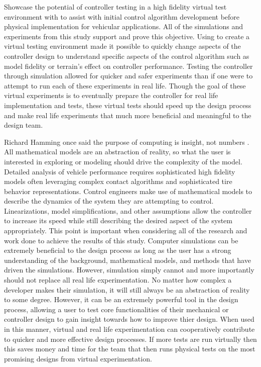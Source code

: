 \documentclass[12pt,onecolumn]{report}
\newcommand{\CHRONO}{{\sffamily{{Chrono}}}}
\begin{document}
\begin{enumerate}
Showcase the potential of controller testing in a high fidelity virtual test environment with {\CHRONO} to assist with initial control algorithm development before physical implementation for vehicular applications. All of the simulations and experiments from this study support and prove this objective. Using {\CHRONO} to create a virtual testing environment made it possible to quickly change aspects of the controller design to understand specific aspects of the control algorithm such as model fidelity or terrain's effect on controller performance. Testing the controller through simulation allowed for quicker and safer experiments than if one were to attempt to run each of these experiments in real life. Though the goal of these virtual experiments is to eventually prepare the controller for real life implementation and tests, these virtual tests should speed up the design process and make real life experiments that much more beneficial and meaningful to the design team. 
\end{enumerate}

Richard Hamming once said the purpose of computing is insight, not numbers \cite{NumMethods}. All mathematical models are an abstraction of reality, so what the user is interested in exploring or modeling should drive the complexity of the model. Detailed analysis of vehicle performance requires sophisticated high fidelity models often leveraging complex contact algorithms and sophisticated tire behavior representations. Control engineers make use of mathematical models to describe the dynamics of the system they are attempting to control. Linearizations, model simplifications, and other assumptions allow the controller to increase its speed while still describing the desired aspect of the system appropriately. This point is important when considering all of the research and work done to achieve the results of this study. Computer simulations can be extremely beneficial to the design process as long as the user has a strong understanding of the background, mathematical models, and methods that have driven the simulations. However, simulation simply cannot and more importantly should not replace all real life experimentation. No matter how complex a developer makes their simulation, it will still always be an abstraction of reality to some degree. However, it can be an extremely powerful tool in the design process, allowing a user to test core functionalities of their mechanical or controller design to gain insight towards how to improve thier design. When used in this manner, virtual and real life experimentation can cooperatively contribute to quicker and more effective design processes. If more tests are run virtually then this saves money and time for the team that then runs physical tests on the most promising designs from virtual experimentation.  
\end{document}
